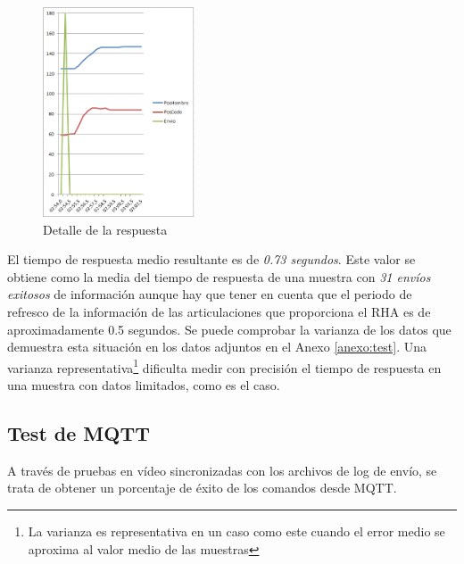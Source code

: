 \begin{figure}[tb]
\centering
\includegraphics[width=0.4\textwidth]{figuras/tresp.png}
\caption{Detalle de la respuesta}
\label{fig:tresp}
\end{figure}

El tiempo de respuesta medio resultante es de \textit{0.73 segundos}. Este valor se obtiene como la media del tiempo de respuesta de una muestra con \textit{31 envíos exitosos} de información aunque hay que tener en cuenta que el periodo de refresco de la información de las articulaciones que proporciona el RHA es de aproximadamente 0.5 segundos. Se puede comprobar la varianza de los datos que demuestra esta situación en los datos adjuntos en el Anexo \ref{anexo:test}. Una varianza representativa\footnote{La varianza es representativa en un caso como este cuando el error medio se aproxima al valor medio de las muestras} dificulta medir con precisión el tiempo de respuesta en una muestra con datos limitados, como es el caso.

\subsection{Test de MQTT}

A través de pruebas en vídeo sincronizadas con los archivos de log de envío, se trata de obtener un porcentaje de éxito de los comandos desde MQTT.

